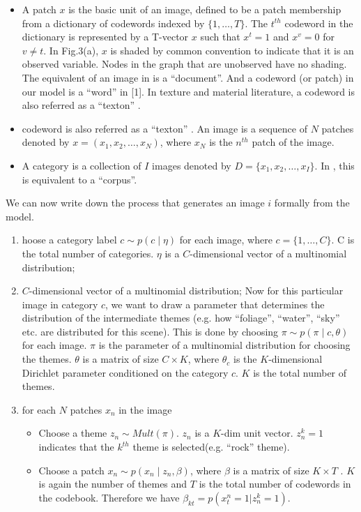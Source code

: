 \documentclass[10pt,a4paper,twocolumn]{article}
\begin{document}
\begin{itemize}
\item  A patch $x$ is the basic unit of an image, defined to be a patch membership from a dictionary of codewords indexed by $\{1, \ldots, T\}$. The $t^{th}$ codeword in the dictionary is represented by a T-vector $x$ such that $x^{t} =1$ and $x^{v} = 0$ for $v \neq t$. In Fig.3(a), $x$ is shaded by common convention to indicate that it is an observed variable. Nodes in the graph that are unobserved have no shading. The equivalent of an image in \cite{blei} is a “document”. And a codeword (or patch) in our model is a “word” in [1]. In texture and material literature, a codeword is also referred as a “texton” \cite{malik, varma}.

\item codeword is also referred as a “texton” \cite{malik, varma}. An image is a sequence of $N$ patches denoted by $x = (x_1, x_2, \ldots, x_N)$, where $x_N$ is the $n^{th}$ patch of the image.

\item A category is a collection of $I$ images denoted by $D = \{x_1, x_2, \ldots, x_I\}$. In \cite{blei}, this is equivalent to a “corpus”.
\end{itemize}

We can now write down the process that generates an image $i$ formally from the model.

\begin{enumerate}

\item hoose a category label $c \sim p(c\mid\eta)$ for each image, where $c = \{1, \ldots, C\}$. C is the total number of categories. $\eta$ is a $C$-dimensional vector of a multinomial distribution;

\item $C$-dimensional vector of a multinomial distribution; Now for this particular image in category $c$, we want to draw a parameter that determines the distribution of the intermediate themes (e.g. how “foliage”, “water”, “sky” etc. are distributed for this scene). This is done by choosing $\pi\sim p(\pi\mid c, \theta)$ for each image. $\pi$ is the parameter of a multinomial distribution for choosing the themes. $\theta$ is a matrix of size $C \times K$, where $\theta_c$ is the $K$-dimensional Dirichlet parameter conditioned on the category $c$. $K$ is the total number of themes.

\item  for each $N$ patches $x_n$ in the image
\begin{itemize}
\item Choose a theme $z_n \sim Mult(\pi)$. $z_n$ is a $K$-dim unit vector. $z_n^{k} = 1$ indicates that the $k^{th}$ theme is selected(e.g. “rock” theme).

\item Choose a patch $x_n \sim p(x_n \mid z_n, \beta)$, where $\beta$ is a matrix of size $K \times T$ . $K$ is again the number of themes and $T$ is the total number of codewords in the codebook. Therefore we have $\beta_{kt} = p(x_t^{n} = 1|z_n^{k} = 1)$.
\end{itemize}
\end{enumerate}
\end{document}
